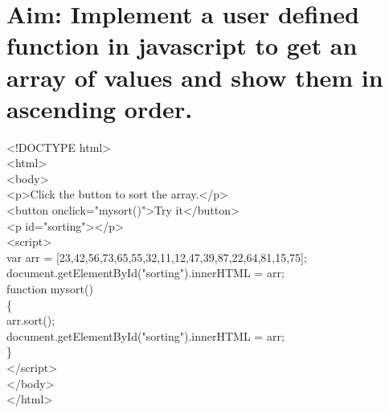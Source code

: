 \section*{\fontsize{16}{14}\selectfont Aim: Implement a user defined function in javascript to get an array of values and show them in ascending order. }
<!DOCTYPE html>\\
<html>\\
<body>\\
<p>Click the button to sort the array.</p>\\
<button onclick="mysort()">Try it</button>\\
<p id="sorting"></p>\\
<script>\\
var arr = [23,42,56,73,65,55,32,11,12,47,39,87,22,64,81,15,75];\\
document.getElementById("sorting").innerHTML = arr;\\
function mysort() \\
\{\\
    arr.sort();\\
    document.getElementById("sorting").innerHTML = arr;\\
\}\\
</script>\\
</body>\\
</html>

